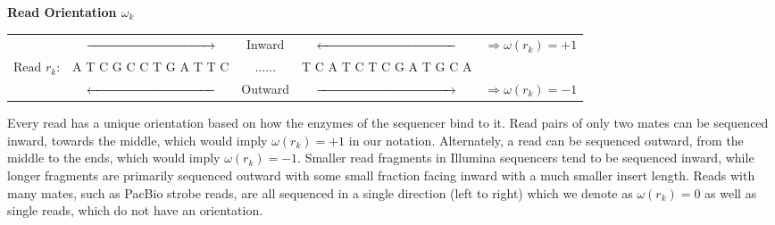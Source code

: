 \documentclass[phd,tocprelim]{cornell}
\begin{document}
\begin{center}
\textbf{Read Orientation $\omega_{k}$} \\
\begin{tabular}{ccccc} \\
 & $\xrightarrow{\hspace*{3.4cm}}$ & Inward & $\xleftarrow{\hspace*{3.7cm}}$ & $\Rightarrow \omega(r_{k}) = +1$ \\
 Read $r_{k}$: & {\color{red} A}{\color{blue} T}{\color{MyDarkGreen} C}{\color{orange} G}{\color{MyDarkGreen} C}{\color{MyDarkGreen} C}{\color{blue} T}{\color{orange} G}{\color{red} A}{\color{blue} T}{\color{blue} T}{\color{MyDarkGreen} C} & $\hdots\hdots$ & {\color{blue} T}{\color{MyDarkGreen} C}{\color{red} A}{\color{blue} T}{\color{MyDarkGreen} C}{\color{blue} T}{\color{MyDarkGreen} C}{\color{orange} G}{\color{red} A}{\color{blue} T}{\color{orange} G}{\color{MyDarkGreen} C}{\color{red} A} & \\
 & $\xleftarrow{\hspace*{3.4cm}}$ & Outward & $\xrightarrow{\hspace*{3.7cm}}$ & $\Rightarrow \omega(r_{k}) = -1$
\end{tabular}
\end{center}
Every read has a unique orientation based on how the enzymes of the sequencer bind to it. Read pairs of only two mates can be sequenced inward, towards the middle, which would imply $\omega(r_{k}) = +1$ in our notation. Alternately, a read can be sequenced outward, from the middle to the ends, which would imply $\omega(r_{k}) = -1$. Smaller read fragments in Illumina sequencers tend to be sequenced inward, while longer fragments are primarily sequenced outward with some small fraction facing inward with a much smaller insert length. Reads with many mates, such as PacBio strobe reads, are all sequenced in a single direction (left to right) which we denote as $\omega(r_{k}) = 0$ as well as single reads, which do not have an orientation.
\end{document}
